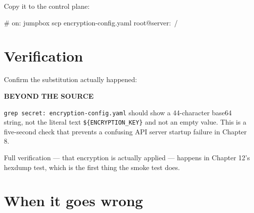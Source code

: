 \documentclass[11pt,oneside]{report}
\newcommand{\calloutlabel}[2]{{\sffamily\bfseries\footnotesize\color{#1}#2\quad}}
\begin{document}
Copy it to the
control plane:

\begin{cmdlst}
# on: jumpbox
scp encryption-config.yaml root@server:~/
\end{cmdlst}

\hypertarget{verification-5}{%
\section{Verification}\label{verification-5}}

Confirm the
substitution
actually happened:

\begin{beyondbox}\calloutlabel{teal}{BEYOND THE SOURCE}

\texttt{grep\ secret:}\allowbreak{}\texttt{\ encryption-}\allowbreak{}\texttt{config.}\allowbreak{}\texttt{yaml}
should show a
44-character base64
string, not the
literal text
\texttt{\$\{ENCRYPTION\_KEY\}}
and not an empty
value. This is a
five-second check
that prevents a
confusing API server
startup failure in
Chapter 8.

\end{beyondbox}

Full verification
--- that encryption
is actually applied
--- happens in
Chapter 12's hexdump
test, which is the
first thing the
smoke test does.

\hypertarget{when-it-goes-wrong-5}{%
\section{When it
goes
wrong}\label{when-it-goes-wrong-5}}
\end{document}
